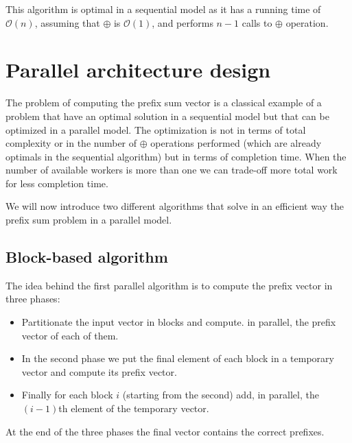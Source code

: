 \documentclass{article}
\begin{document}
This algorithm is optimal in a sequential model as it has a running time of $\mathcal{O}(n)$, assuming that $\oplus$ is $\mathcal{O}(1)$, and performs $n-1$ calls to $\oplus$ operation.
 
\section{Parallel architecture design}

The problem of computing the prefix sum vector is a classical example of a problem that have an optimal solution in a sequential model but that can be optimized in a parallel model. 
The optimization is not in terms of total complexity or in the number of $\oplus$ operations performed (which are already optimals in the sequential algorithm) but in terms of completion time. When the number of available workers is more than one we can trade-off more total work for less completion time.
\medskip

We will now introduce two different algorithms that solve in an efficient way the prefix sum problem in a parallel model. 

\subsection{Block-based algorithm}

The idea behind the first parallel algorithm is to compute the prefix vector in three phases:

\begin{itemize}
  \item Partitionate the input vector in blocks and compute. in parallel, the prefix vector of each of them.
  \item In the second phase we put the final element of each block in a temporary vector and compute its prefix vector.
  \item Finally for each block $i$ (starting from the second) add, in parallel, the $(i-1)$th element of the temporary vector.
\end{itemize}

At the end of the three phases the final vector contains the correct prefixes.
\end{document}
